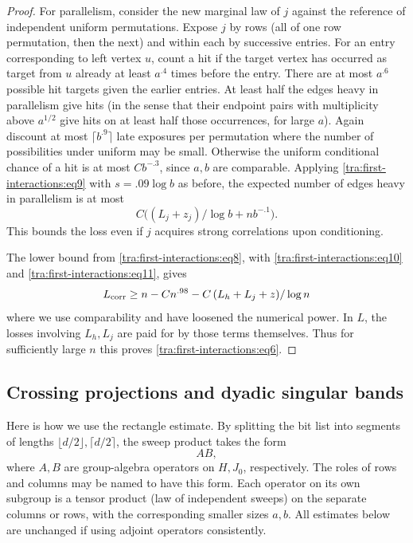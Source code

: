 \begin{proof}
For parallelism, consider the new marginal law of \(j\) against the reference of independent uniform permutations. Expose \(j\) by rows (all of one row permutation, then the next) and within each by successive entries. For an entry corresponding to left vertex \(u\), count a hit if the target vertex has occurred as target from \(u\) already at least \(a^{.4}\) times before the entry. There are at most \(a^{.6}\) possible hit targets given the earlier entries. At least half the edges heavy in parallelism give hits (in the sense that their endpoint pairs with multiplicity above \(a^{1/2}\) give hits on at least half those occurrences, for large \(a\)). Again discount at most \(\lceil b^{.9}\rceil\) late exposures per permutation where the number of possibilities under uniform may be small. Otherwise the uniform conditional chance of a hit is at most \(C b^{-.3}\), since \(a,b\) are comparable. Applying \eqref{tra:first-interactions:eq9} with \(s=.09\log b\) as before, the expected number of edges heavy in parallelism is at most
\begin{equation}
                      C\big((L_j+z_j)/\log b+n b^{-.1}\big).\label{tra:first-interactions:eq11}
\end{equation}
This bounds the loss even if \(j\) acquires strong correlations upon conditioning.

The lower bound from \eqref{tra:first-interactions:eq8}, with \eqref{tra:first-interactions:eq10} and \eqref{tra:first-interactions:eq11}, gives
\[
                     L_{\rm corr}\ge n-C n^{.98}
                                   - C\,(L_h+L_j+z)/\log n
\]
where we use comparability and have loosened the numerical power. In \(L\), the losses involving \(L_h,L_j\) are paid for by those terms themselves. Thus for sufficiently large \(n\) this proves \eqref{tra:first-interactions:eq6}.

\end{proof}

\subsection{Crossing projections and dyadic singular bands}

\label{tra:first-interactions:subgroup-product-setup}
Here is how we use the rectangle estimate. By splitting the bit list into segments of lengths \(\lfloor d/2\rfloor,\lceil d/2\rceil\), the sweep product takes the form
\[
                                A B ,
\]
where \(A,B\) are group-algebra operators on \(H,J_0\), respectively. The roles of rows and columns may be named to have this form. Each operator on its own subgroup is a tensor product (law of independent sweeps) on the separate columns or rows, with the corresponding smaller sizes \(a,b\). All estimates below are unchanged if using adjoint operators consistently.

